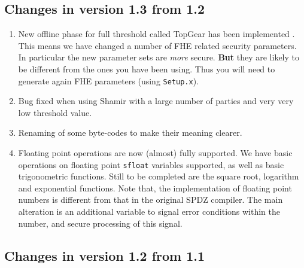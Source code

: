 \subsection{Changes in version 1.3 from 1.2}
\begin{enumerate}
\item New offline phase for full threshold called TopGear has been
implemented \cite{TopGear}. This means we have changed a number
of FHE related security parameters. In particular the new parameter
sets are {\em more} secure.
{\bf But} they are likely to be different from the ones you have
been using. Thus you will need to generate again FHE parameters
(using \verb+Setup.x+).
\item Bug fixed when using Shamir with a large number of parties
and very very low threshold value.
\item Renaming of some byte-codes to make their meaning clearer.
\item Floating point operations are now (almost) fully supported.
We have basic operations on floating point \verb+sfloat+ variables
supported, as well as basic trigonometric functions. Still to
be completed are the square root, logarithm and exponential functions.
Note that, the implementation of floating point numbers is
different from that in the original SPDZ compiler. The main alteration
is an additional variable to signal error conditions within the
number, and secure processing of this signal.
\end{enumerate}


\subsection{Changes in version 1.2 from 1.1}

